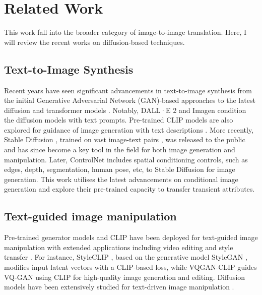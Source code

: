 \section{Related Work}\label{zero-shot-RW}
This work fall into the broader category of image-to-image translation. Here, I will review the recent works on diffusion-based techniques.

\subsection{Text-to-Image Synthesis}

Recent years have seen significant advancements in text-to-image synthesis from the initial Generative Adversarial Network (GAN)-based approaches \cite{li2020manigan,xu2018attngan, zhang2017stackgan, zhang2018stackgan++} to the latest diffusion \cite{gu2022vector, ho2020denoising,nichol2021improved,ramesh2022hierarchical, rombach2022high, saharia2022photorealistic,song2020denoising,zhang2023adding} and transformer models \cite{ding2022cogview2, esser2021taming, ramesh2021zero, yu2022scaling}. Notably, DALL·E 2 \cite{ramesh2022hierarchical} and Imagen \cite{ho2022imagen} condition the diffusion models with text prompts.  Pre-trained CLIP models \cite{radford2021learning} are also explored for guidance of image generation with text descriptions \cite{crowson2022vqgan, ramesh2022hierarchical}. More recently, Stable Diffusion \cite{rombach2022high}, trained on vast image-text pairs \cite{schuhmann2021laion}, was released to the public and has since become a key tool in the field for both image generation and manipulation. Later, ControlNet \cite{zhang2023adding} includes spatial conditioning controls, such as edges, depth, segmentation, human pose, etc, to Stable Diffusion for image generation. This work utilises the latest advancements on conditional image generation and explore their pre-trained capacity to transfer transient attributes.

\subsection{Text-guided image manipulation}
Pre-trained generator models and CLIP \cite{radford2021learning} have been deployed for text-guided image manipulation with extended applications including video editing and style transfer \cite{bar2022text2live, gal2022stylegan,kwon2022clipstyler, liu2021fusedream, patashnik2021styleclip}. For instance, StyleCLIP \cite{patashnik2021styleclip}, based on the generative model StyleGAN \cite{karras2020analyzing}, modifies input latent vectors with a CLIP-based loss, while VQGAN-CLIP \cite{crowson2022vqgan} guides VQ-GAN \cite{esser2021taming} using CLIP for high-quality image generation and editing. Diffusion models have been extensively studied for text-driven image manipulation \cite{avrahami2022blended, gal2022image, kawar2023imagic, kim2022diffusionclip, liu2023more, meng2021sdedit,nichol2021glide,ruiz2023dreambooth}.


